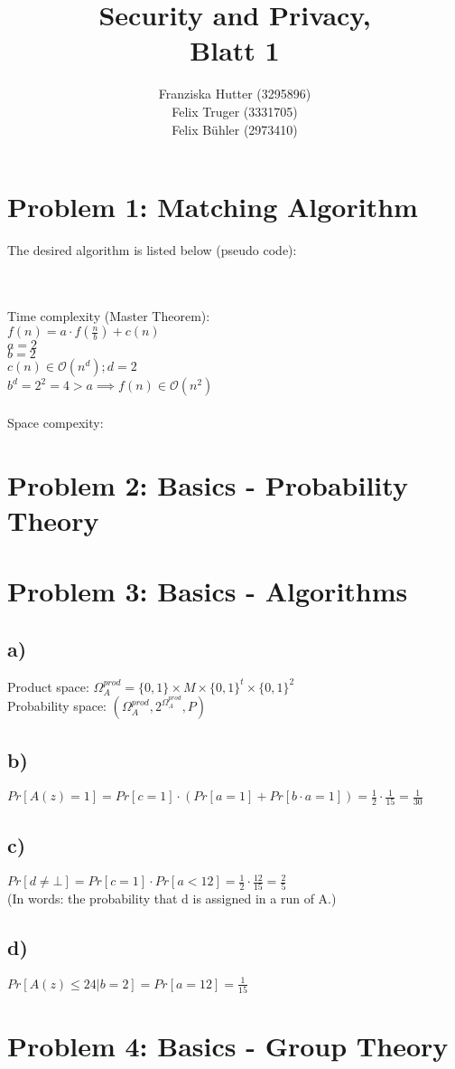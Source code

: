 \documentclass[12pt,pdftex,a4paper]{article}
\title{Security and Privacy,\\ Blatt 1}
\author{Franziska Hutter (3295896)\\
	Felix Truger (3331705)\\
	Felix Bühler (2973410)}
\newcommand\tab[1][1cm]{\hspace*{#1}}
\begin{document}
\maketitle
\pagebreak

\section*{Problem 1: Matching Algorithm}

The desired algorithm is listed below (pseudo code):

\ %
\\~\\
Time complexity (Master Theorem):\\ 
\tab $f(n) = a \cdot f(\frac{n}{b}) + c(n)$\\
\tab $a = 2$\\
\tab $b = 2$\\
\tab $c(n) \in \mathcal{O}(n^d); d = 2$\\
\tab $b^d = 2^2 = 4 > a \implies f(n) \in \mathcal{O}(n^2)$\\~\\

Space compexity:

\section*{Problem 2: Basics - Probability Theory}

\section*{Problem 3: Basics - Algorithms}

\subsection*{a)} 
Product space: $\Omega_A^{prod} = \{0, 1\} \times M \times \{0, 1\}^t \times \{0, 1\}^2$\\
Probability space: $(\Omega_A^{prod}, 2^{\Omega_A^{prod}}, P)$

\subsection*{b)}
$Pr[A(z) = 1] = Pr[c = 1] \cdot (Pr[a = 1] + Pr[b \cdot a = 1]) = \frac{1}{2} \cdot \frac{1}{15} = \frac{1}{30}$

\subsection*{c)}
$Pr[d \neq \bot] = Pr[c = 1] \cdot Pr[a < 12] = \frac{1}{2} \cdot \frac{12}{15} = \frac{2}{5}$\\
(In words: the probability that d is assigned in a run of A.)

\subsection*{d)}
$Pr[A(z) \leq 24 | b = 2] = Pr[a = 12] = \frac{1}{15}$

\section*{Problem 4: Basics - Group Theory}
\end{document}
